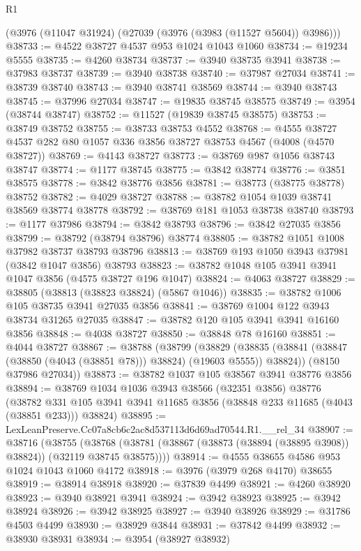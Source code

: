 \begin{lexlean}{R1}
\begin{coremodule}
    (@3976 (@11047 @31924) (@27039 (@3976 (@3983 (@11527 @5604)) @3986)))
@38733 := @4522 @38727 @4537 @953 @1024 @1043 @1060
@38734 := @19234 @5555
@38735 := @4260 @38734
@38737 := @3940 @38735 @3941
@38738 := @37983 @38737
@38739 := @3940 @38738
@38740 := @37987 @27034
@38741 := @38739 @38740
@38743 := @3940 @38741 @38569
@38744 := @3940 @38743
@38745 := @37996 @27034
@38747 := @19835 @38745 @38575
@38749 := @3954 (@38744 @38747)
@38752 := @11527 (@19839 @38745 @38575)
@38753 := @38749 @38752
@38755 := @38733 @38753 @4552
@38768 := @4555 @38727 @4537 @282 @80 @1057 @336 @3856 @38727 @38753 @4567 (@4008 (@4570 @38727))
@38769 := @4143 @38727
@38773 := @38769 @987 @1056 @38743 @38747
@38774 := @1177 @38745
@38775 := @3842 @38774
@38776 := @3851 @38575
@38778 := @3842 @38776 @3856
@38781 := @38773 (@38775 @38778) @38752
@38782 := @4029 @38727
@38788 := @38782 @1054 @1039 @38741 @38569 @38774 @38778
@38792 := @38769 @181 @1053 @38738 @38740
@38793 := @1177 @37986
@38794 := @3842 @38793
@38796 := @3842 @27035 @3856
@38799 := @38792 (@38794 @38796) @38774
@38805 := @38782 @1051 @1008 @37982 @38737 @38793 @38796
@38813 := @38769 @193 @1050 @3943 @37981 (@3842 @1047 @3856) @38793
@38823 := @38782 @1048 @105 @3941 @3941 @1047 @3856 (@4575 @38727 @196 @1047)
@38824 := @4063 @38727
@38829 := @38805 (@38813 (@38823 @38824) (@5867 @1046))
@38835 := @38782 @1006 @105 @38735 @3941 @27035 @3856
@38841 := @38769 @1004 @122 @3943 @38734 @31265 @27035
@38847 := @38782 @120 @105 @3941 @3941 @16160 @3856
@38848 := @4038 @38727
@38850 := @38848 @78 @16160
@38851 := @4044 @38727
@38867 := @38788
    (@38799
      (@38829 (@38835 (@38841 (@38847 (@38850 (@4043 (@38851 @78))) @38824) (@19603 @5555)) @38824))
      (@8150 @37986 @27034))
@38873 := @38782 @1037 @105 @38567 @3941 @38776 @3856
@38894 := @38769
    @1034
    @1036
    @3943
    @38566
    (@32351 @3856)
    @38776
    (@38782 @331 @105 @3941 @3941 @11685 @3856 (@38848 @233 @11685 (@4043 (@38851 @233))) @38824)
@38895 := LexLeanPreserve.Cc07a8cb6c2ac8d537113d6d69ad70544.R1.__rel_34
@38907 := @38716
    (@38755
      (@38768 (@38781 (@38867 (@38873 (@38894 (@38895 @3908)) @38824)) (@32119 @38745 @38575))))
@38914 := @4555 @38655 @4586 @953 @1024 @1043 @1060 @4172
@38918 := @3976 (@3979 @268 @4170) @38655
@38919 := @38914 @38918
@38920 := @37839 @4499
@38921 := @4260 @38920
@38923 := @3940 @38921 @3941
@38924 := @3942 @38923
@38925 := @3942 @38924
@38926 := @3942 @38925
@38927 := @3940 @38926
@38929 := @31786 @4503 @4499
@38930 := @38929 @3844
@38931 := @37842 @4499
@38932 := @38930 @38931
@38934 := @3954 (@38927 @38932)

\end{coremodule}
\end{lexlean}

